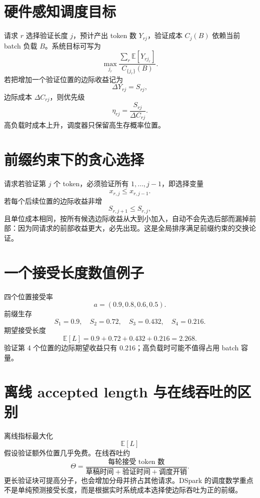 \documentclass[UTF8,12pt,a4paper,fontset=none]{ctexart}
\numberwithin{equation}{section}
\newcommand{\E}{\mathbb{E}}
\begin{document}
\section{硬件感知调度目标}
请求 $r$ 选择验证长度 $j$，预计产出 token 数 $Y_{rj}$，验证成本 $C_j(B)$ 依赖当前 batch 负载 $B$。系统目标可写为
\begin{equation}
 \max_{j_r}
 \frac{\sum_r\E[Y_{rj_r}]}
 {C_{\{j_r\}}(B)}.
\end{equation}
若把增加一个验证位置的边际收益记为
\begin{equation}
 \Delta Y_{rj}=S_{rj},
\end{equation}
边际成本 $\Delta C_{rj}$，则优先级
\begin{equation}
 \eta_{rj}=\frac{S_{rj}}{\Delta C_{rj}}.
\end{equation}
高负载时成本上升，调度器只保留高生存概率位置。

\section{前缀约束下的贪心选择}
请求若验证第 $j$ 个 token，必须验证所有 $1,\ldots,j-1$，即选择变量
\begin{equation}
 x_{r,j}\le x_{r,j-1}.
\end{equation}
若每个后续位置的边际收益非增
\begin{equation}
 S_{r,j+1}\le S_{r,j},
\end{equation}
且单位成本相同，按所有候选边际收益从大到小加入，自动不会先选后部而漏掉前部：因为同请求的前部收益更大，必先出现。这是全局排序满足前缀约束的交换论证。

\section{一个接受长度数值例子}
四个位置接受率
\begin{equation}
 a=(0.9,0.8,0.6,0.5).
\end{equation}
前缀生存
\begin{equation}
 S_1=0.9,
 \quad S_2=0.72,
 \quad S_3=0.432,
 \quad S_4=0.216.
\end{equation}
期望接受长度
\begin{equation}
 \E[L]=0.9+0.72+0.432+0.216=2.268.
\end{equation}
验证第 4 个位置的边际期望收益只有 0.216；高负载时可能不值得占用 batch 容量。

\section{离线 accepted length 与在线吞吐的区别}
离线指标最大化
\begin{equation}
 \E[L]
\end{equation}
假设验证额外位置几乎免费。在线吞吐约
\begin{equation}
 \Theta=\frac{\text{每轮接受 token 数}}
 {\text{草稿时间}+\text{验证时间}+\text{调度开销}}.
\end{equation}
更长验证块可提高分子，也会增加分母并挤占其他请求。DSpark 的调度数学重点不是单纯预测接受长度，而是根据实时系统成本选择使边际吞吐为正的前缀。
\end{document}
